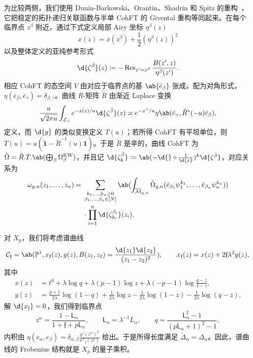\documentclass{amsart}
\theoremstyle{definition}
\theoremstyle{remark}
\theoremstyle{plain}
\theoremstyle{definition}
\theoremstyle{remark}
\renewcommand{\P}{\mathbb{P}}
\newcommand{\Mbar}{\overline{\mathcal{M}}}
\newcommand{\mc}[1]{\mathcal{#1}}
\newcommand{\mf}[1]{\mathfrak{#1}}
\newcommand{\mr}[1]{\mathrm{#1}}
\newcommand{\on}[1]{\operatorname{#1}}
\newcommand{\ms}[1]{\mathsf{#1}}
\newcommand{\wt}[1]{\widetilde{#1}}
\newcommand{\1}{\mathbf{1}}
\newcommand{\2}{\mathbf{2}}
\newcommand{\3}{\mathbf{3}}
\begin{document}
为比较两侧，我们使用 Dunin-Barkowski、Orantin、Shadrin 和 Spitz 的重构~\cite{DOSS2014}，它把稳定的拓扑递归关联函数与半单 CohFT 的 Givental 重构等同起来。在每个临界点 \(z^{\beta}\) 附近，通过下式定义局部 Airy 坐标 \(\eta^{\beta}(z)\)
\[ x(z) = x(z^{\beta}) + \frac{1}{2}(\eta^{\beta}(z))^2 \]
以及整体定义的亚纯参考形式
\[ \d{\zeta^{\bar{\beta}}}(z) \coloneqq -\on{Res}_{z'=z^{\beta}}\frac{B(z',z)}{\eta^{\beta}(z')}. \]
相应 CohFT 的态空间 \(V\) 由对应于临界点的基 \(\ab\{\bar{e}_{\beta}\}\) 张成，配为对角形式，\(\eta(\bar{e}_{\beta},\bar{e}_{\gamma}) = \delta_{\beta,\gamma}\)。曲线 \(R\)-矩阵 \(\check{R}\) 由渐近 Laplace 变换
\[ \frac{u}{\sqrt{2\pi u}}\int_{\mc{L}_{\gamma}} e^{-x(z)/u}\d{\zeta^{\bar{\beta}}}(z) \asymp e^{-x^{\gamma}/u}\eta\ab(\bar{e}_{\gamma}, \check{R}^*(-u)\bar{e}_{\beta}), \]
定义，而 \(\d{y}\) 的类似变换定义 \(T(u)\)；若所得 CohFT 有平坦单位，则 \(T(u) = u(\wt{\1}-\check{R}^{-1}(u)\1)\)。于是 \(\check{R}\) 是辛的，曲线 CohFT 为 \(\check{\Omega} = \check{R}.T.\ab(\bigoplus_{\beta}\Omega^{\mr{KW}}_{\beta})\)，并且记 \(\d{\zeta^{\bar{\beta}}_k} \coloneqq \ab(-\d{} \circ \frac{1}{\d{x}})^k \d{\zeta^{\bar{\beta}}}\)，对应关系为
\begin{align*}
    \omega_{g,n}(z_1,\ldots,z_n) ={}& \sum_{\substack{k_1,\ldots,k_n \geq 0 \\ \beta_1,\ldots,\beta_n \in [N]}}\ab(\int_{\Mbar_{g,n}} \check{\Omega}_{g,n}(\bar{e}_{\beta_1}\psi_1^{k_1},\ldots,\bar{e}_{\beta_n}\psi_n^{k_n})) \\
    &\cdot \prod_{i=1}^n \d{\zeta^{\beta_i}_{k_i}}(z_i).
\end{align*}

对 \(X_p\)，我们将考虑谱曲线
\[ \mc{C}_{\mf{f}} = \ab(\P^1, x_{\mf{f}}(z), y(z), B(z_1,z_2) = \frac{\d{z_1}\d{z_2}}{(z_1-z_2)^2}), \qquad x_{\mf{f}}(z) = x(z) + 2\mf{f}\lambda^2 y(z), \]
其中
\begin{align*}
    x(z) &= t^0 + \lambda \log q + \lambda(p-1)\log z + \lambda(-p-1)\log\frac{q-z}{1-z}, \\
    y(z) &= \frac{p+1}{2\lambda}\log(1-q) + \frac{1}{2\lambda}\log z - \frac{1}{2\lambda}\log(1-z) - \frac{1}{2\lambda}\log(q-z).
\end{align*}
解 \(\d{x_{\mf{f}}} = 0\)，我们得到临界点
\[ z^{\alpha} = \frac{1-\ms{L}_{\alpha}}{1+\mf{f}+p\ms{L}_{\alpha}}, \qquad \ms{L}_{\alpha} = \lambda^{-1}L_{\alpha}, \qquad q = \frac{\ms{L}_{\alpha}^2-1}{(p\ms{L}_{\alpha}+1)^2-1}, \]
内积由 \(\eta(e_{\alpha},e_{\beta}) = \delta_{\alpha,\beta}\frac{y'(z^{\alpha})^2}{x''_{\mf{f}}(z^{\alpha})}\) 给出。于是所得长度满足 \(\check{\Delta}_{\alpha} = \Delta_{\alpha}\)。因此，谱曲线的 Frobenius 结构就是 \(X_p\) 的量子乘积。
\end{document}
